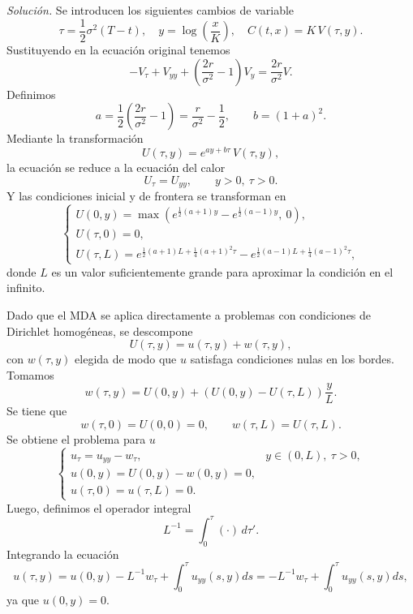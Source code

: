 \documentclass[12pt]{article}
\newcommand{\sol}{\textit{Solución. }}
\newcommand{\pp}[1]{\left( #1 \right)}
\begin{document}
\begin{enumerate}
\begin{enumerate}[(a)]
            \sol Se introducen los siguientes cambios de variable 
            \[ \tau = \frac{1}{2}\sigma^2 (T-t),\quad y = \log\pp{\frac{x}{K}},
            \quad C(t,x) = K\,V(\tau,y). \]
            Sustituyendo en la ecuación original tenemos
            \[ -V_\tau + V_{yy} + \pp{\frac{2r}{\sigma^2}-1}V_y =
            \frac{2r}{\sigma^2} V. \]
            Definimos
            \[ a = \frac{1}{2}\pp{\frac{2r}{\sigma^2}-1} = \frac{r}{\sigma^2}
            -\frac{1}{2},\qquad b = (1+a)^2. \]
            Mediante la transformación 
            \[ U(\tau,y) = e^{a y + b\tau}\, V(\tau,y), \]
            la ecuación se reduce a la ecuación del calor
            \[ U_\tau = U_{yy}, \qquad y>0,~\tau>0. \]
            Y las condiciones inicial y de frontera se transforman en
            \[ \begin{cases}
                    U(0,y) = \max\pp{e^{\frac{1}{2}(a+1)y}
                    -e^{\frac{1}{2}(a-1)y},~0},\\
                    U(\tau,0) = 0,\\
                    U(\tau,L) = e^{\frac{1}{2}(a+1)L + \frac{1}{4}(a+1)^2\tau}
                    -e^{\frac{1}{2}(a-1)L + \frac{1}{4}(a-1)^2\tau},
                \end{cases} \]
            donde $L$ es un valor suficientemente grande para aproximar la
            condición en el infinito.

            Dado que el MDA se aplica directamente a problemas con condiciones
            de Dirichlet homogéneas, se descompone
            \[ U(\tau,y) = u(\tau,y) + w(\tau,y), \]
            con $w(\tau,y)$ elegida de modo que $u$ satisfaga condiciones nulas
            en los bordes. Tomamos
            \[ w(\tau,y) = U(0,y) + \pp{U(0,y)-U(\tau,L)}\frac{y}{L}. \]
            Se tiene que
            \[ w(\tau,0)=U(0,0)=0,\qquad w(\tau,L)=U(\tau,L). \]
            Se obtiene el problema para $u$
            \[ \begin{cases}
                u_\tau = u_{yy} - w_\tau, & y\in(0,L),~\tau>0,\\
                u(0,y) = U(0,y)-w(0,y)=0,&\\
                u(\tau,0)= u(\tau,L)=0.&
            \end{cases} \]
            Luego, definimos el operador integral
            \[ L^{-1} = \int_0^\tau (\cdot)\,d\tau'. \]
            Integrando la ecuación
            \[ u(\tau,y) = u(0,y) - L^{-1}w_\tau + \int_0^\tau u_{yy}(s,y)ds =
            -L^{-1}w_\tau + \int_0^\tau u_{yy}(s,y)ds, \]
            ya que $u(0,y)=0$.


\end{enumerate}
\end{enumerate}
\end{document}
